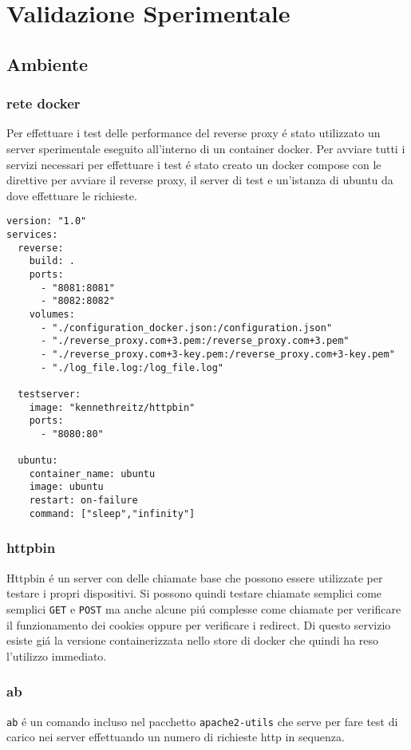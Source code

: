 \chapter{Validazione Sperimentale}
\label{cha:Sperimentale}

\section{Ambiente}
\subsection{rete docker}
Per effettuare i test delle performance del reverse proxy é stato utilizzato un server sperimentale eseguito all'interno di un container docker. Per avviare tutti i servizi necessari per effettuare i test é stato creato un docker compose con le direttive per avviare il reverse proxy, il server di test e un'istanza di ubuntu da dove effettuare le richieste.

\begin{lstlisting}[language=DockerCompose]
version: "1.0"
services:
  reverse:
    build: .
    ports:
      - "8081:8081"
      - "8082:8082"
    volumes:
      - "./configuration_docker.json:/configuration.json"
      - "./reverse_proxy.com+3.pem:/reverse_proxy.com+3.pem"
      - "./reverse_proxy.com+3-key.pem:/reverse_proxy.com+3-key.pem"
      - "./log_file.log:/log_file.log"

  testserver:
    image: "kennethreitz/httpbin"
    ports:
      - "8080:80"

  ubuntu:
    container_name: ubuntu
    image: ubuntu
    restart: on-failure
    command: ["sleep","infinity"]

\end{lstlisting}

\subsection{httpbin}
\cite{httpbin}
Httpbin é un server con delle chiamate base che possono essere utilizzate per testare i propri dispositivi. Si possono quindi testare chiamate semplici come semplici \texttt{GET} e \texttt{POST} ma anche alcune piú complesse come chiamate per verificare il funzionamento dei cookies oppure per verificare i redirect. Di questo servizio esiste giá la versione containerizzata nello store di docker che quindi ha reso l'utilizzo immediato.

\subsection{ab}
\cite{ab}
\texttt{ab} é un comando incluso nel pacchetto \texttt{apache2-utils} che serve per fare test di carico nei server effettuando un numero di richieste http in sequenza.

